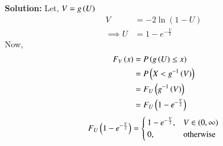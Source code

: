 \documentclass[journal,12pt,twocolumn]{IEEEtran}
\renewcommand\thesection{\arabic{section}}
\begin{document}
\begin{enumerate}[label=\thesection.\arabic*
,ref=\thesection.\theenumi]
\textbf{Solution:}
Let, $V = g\left(U\right)$
\begin{align}
    V &= -2\ln{(1 - U)} \\
    \implies U &= 1 - e^{-\frac{V}{2}}
\end{align}
Now, 
\begin{align}
    F_{V}\left(x\right) &= P\left(g\left(U\right)\leq x\right) \\
                  &= P\left(X < g^{-1}\left(V\right)\right) \\
                  &= F_{U}\left(g^{-1}\left(V\right)\right) \\
                  &= F_{U}\left(1 - e^{-\frac{V}{2}}\right)
\end{align}
\begin{align}  
F_{U}\left(1 - e^{-\frac{V}{2}}\right) = 
\begin{cases}
1 - e^{-\frac{V}{2}}, & V \in (0,\infty) \\
0, & \text{otherwise}
\end{cases}
\end{align}
\end{enumerate}
\end{document}
